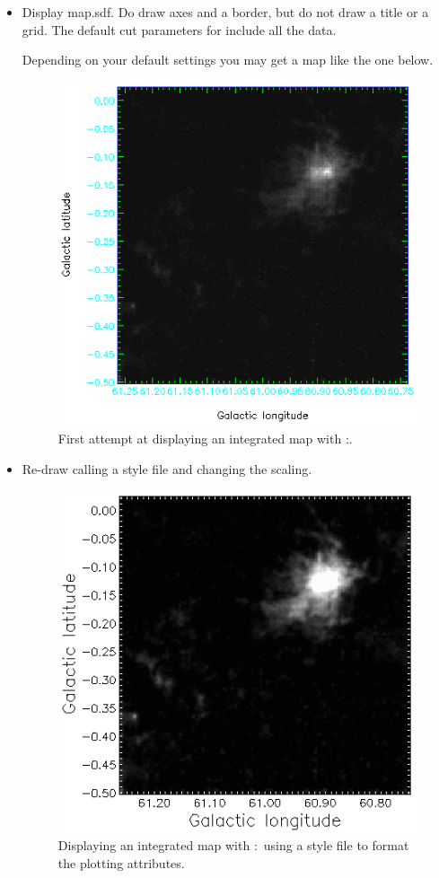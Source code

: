 \documentclass[11pt,oneside,chapters]{starlink}
\begin{document}
\begin{itemize}
\item Display map.sdf. Do draw axes and a border, but do not draw a
title or a grid. The default cut parameters for 
include all the data.
\begin{terminalv}
\end{terminalv}
Depending on your default settings you may get a map like the one below.

\begin{figure}[h!]
\begin{center}
\includegraphics[width=0.475\linewidth]{sc20_display1}
\caption[First attempt at displaying an integrated map with \Kappa:\display.]{\label{fig:display1}
  First attempt at displaying an integrated map with \Kappa:\display.}
\end{center}
\end{figure}

\item Re-draw calling a style file and changing the scaling.
\begin{terminalv}
\end{terminalv}

\begin{figure}[h!]
\begin{center}
\includegraphics[width=0.475\linewidth]{sc20_display2}
\caption[Displaying an integrated map with \Kappa:\display\ using a style file.]{\label{fig:display2}
  Displaying an integrated map with \Kappa:\display\ using a style file
  to format the plotting attributes.}
\end{center}
\end{figure}


\end{itemize}
\end{document}
